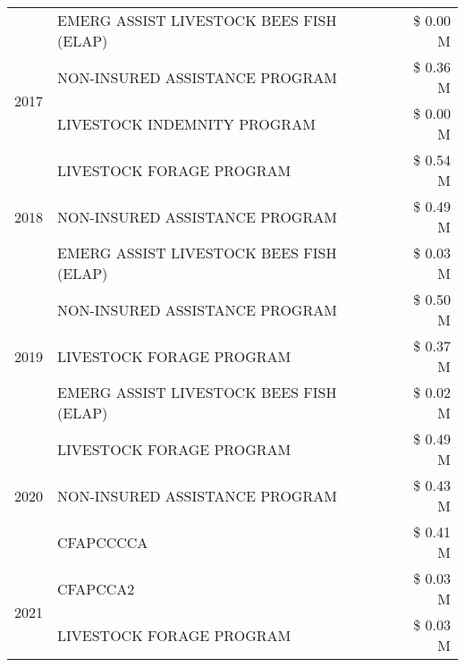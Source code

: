 \begin{tabular}{llr}
 & EMERG ASSIST LIVESTOCK BEES FISH (ELAP) & \$ 0.00 M \\
\cline{1-3}
\multirow[t]{2}{*}{2017} & NON-INSURED ASSISTANCE PROGRAM & \$ 0.36 M \\
 & LIVESTOCK INDEMNITY PROGRAM & \$ 0.00 M \\
\cline{1-3}
\multirow[t]{3}{*}{2018} & LIVESTOCK FORAGE PROGRAM & \$ 0.54 M \\
 & NON-INSURED ASSISTANCE PROGRAM & \$ 0.49 M \\
 & EMERG ASSIST LIVESTOCK BEES FISH (ELAP) & \$ 0.03 M \\
\cline{1-3}
\multirow[t]{3}{*}{2019} & NON-INSURED ASSISTANCE PROGRAM & \$ 0.50 M \\
 & LIVESTOCK FORAGE PROGRAM & \$ 0.37 M \\
 & EMERG ASSIST LIVESTOCK BEES FISH (ELAP) & \$ 0.02 M \\
\cline{1-3}
\multirow[t]{3}{*}{2020} & LIVESTOCK FORAGE PROGRAM & \$ 0.49 M \\
 & NON-INSURED ASSISTANCE PROGRAM & \$ 0.43 M \\
 & CFAPCCCCA & \$ 0.41 M \\
\cline{1-3}
\multirow[t]{2}{*}{2021} & CFAPCCA2 & \$ 0.03 M \\
 & LIVESTOCK FORAGE PROGRAM & \$ 0.03 M \\
\cline{1-3}
\bottomrule
\end{tabular}
